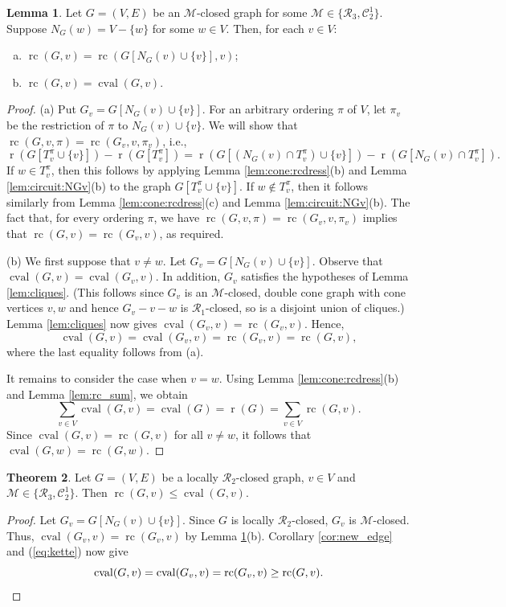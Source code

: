 \documentclass[11pt,a4paper]{article}
\theoremstyle{definition}
\newtheorem{theorem}{Theorem}[section]
\newtheorem{lemma}[theorem]{Lemma}
\DeclareMathOperator{\rr}{r}
\DeclareMathOperator{\rc}{rc}
\DeclareMathOperator{\cval}{cval}
\newcommand{\cR}{\mathcal{R}}
\newcommand{\cM}{\mathcal{M}}
\newcommand{\cC}{\mathcal{C}}
\begin{document}
\begin{lemma}\label{lem:cone:rcdress:rc}
Let  $G=(V,E)$ be an $\cM$-closed graph for some  $\cM\in \{\cR_3,\cC_2^1\}$. Suppose $N_G(w)=V-\{w\}$ for some $w\in V$. 
Then, for each $v\in V$:
\begin{enumerate}[(a)]
\item 
$\rc(G,v)=\rc(G[N_G(v)\cup \{v\}],v)$;
\item $\displaystyle\rc(G,v)=\cval(G,v)$.
\end{enumerate}
\end{lemma}
\begin{proof}
(a) Put $G_v=G[N_G(v)\cup \{v\}].$ 	
For an arbitrary ordering $\pi$ of $V$, let $\pi_v$ be the restriction of $\pi$ to $N_G(v)\cup \{v\}$.
We will show  that $\rc(G, v,\pi)=\rc(G_v, v,\pi_v)$,
i.e.,
$$ \rr(G[T_v^\pi\cup \{v\}])-\rr(G[T_v^\pi])=\rr(G[(N_G(v)\cap T_v^\pi)\cup \{v\}])-\rr(G[N_G(v)\cap T_v^\pi]).$$ 
If $w\in T_v^\pi$, then this follows by applying Lemma \ref{lem:cone:rcdress}(b) and Lemma \ref{lem:circuit:NGv}(b) to the graph $G[T_v^\pi\cup \{v\}]$.
If $w\notin T_v^\pi$, then it follows similarly from Lemma \ref{lem:cone:rcdress}(c) and Lemma \ref{lem:circuit:NGv}(b). 
The fact that, for every ordering $\pi$, we have $\rc(G, v,\pi)=\rc(G_v, v,\pi_v)$ implies that $\rc(G,v)=\rc(G_v,v)$, as required.

\medskip

(b) 
We first suppose that $v\neq w$. Let $G_v=G[N_G(v)\cup \{v\}]$. Observe that $\cval(G,v)=\cval(G_v,v)$. 
In addition, $G_v$ satisfies the hypotheses of Lemma \ref{lem:cliques}. (This follows since $G_v$ is an $\cM$-closed, double cone graph with cone vertices $v,w$ and hence $G_v-v-w$ is $\cR_1$-closed, so is a disjoint union of cliques.)
Lemma \ref{lem:cliques} now gives $\cval(G_v,v)=\rc(G_v,v)$. 
Hence, 
$$\cval(G,v)=\cval(G_v,v)=\rc(G_v,v)=\rc(G,v),$$ where the last equality follows from (a).

It remains to consider the case when $v=w$. Using Lemma \ref{lem:cone:rcdress}(b) and Lemma \ref{lem:rc_sum}, we obtain $$\sum_{v\in V}\cval(G,v)=\cval(G)=\rr(G)=\sum_{v\in V}{\rc(G,v)}.$$
Since $\cval(G,v)=\rc(G,v)$ for all $v\neq w$, it follows that $\cval(G,w)=\rc(G,w)$.
\end{proof}


\begin{theorem}\label{thm:rcdress:ineq:rc}
Let  $G=(V,E)$ be a locally $\cR_2$-closed graph, $v\in V$ and  $\cM\in \{\cR_3,\cC_2^1\}$.  
Then  $\rc(G,v)\leq \cval(G,v).$
\end{theorem}
\begin{proof} Let $G_v=G[N_G(v)\cup \{v\}]$. 
Since $G$ is locally $\cR_2$-closed, $G_v$ is $\cM$-closed. Thus, $\cval(G_v,v)=\rc(G_v,v)$ by Lemma \ref{lem:cone:rcdress:rc}(b). Corollary \ref{cor:new_edge} and (\ref{eq:kette}) now give
\begin{equation*}
    \cval(G,v)=\cval(G_v,v)=\rc(G_v,v)\geq \rc(G,v).\qedhere
\end{equation*}
\end{proof}
\end{document}
